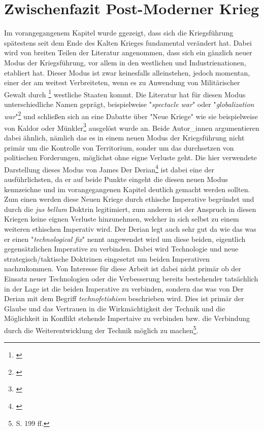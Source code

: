 \documentclass[11pt,a4paper,oneside,numbers=noenddot,bibliography=totocnumbered,DIV=13]{scrartcl}
\begin{document}
\section{Zwischenfazit Post-Moderner Krieg}
Im vorangegangenem Kapitel wurde ggezeigt, dass sich die Kriegsführung spätestens seit dem Ende des Kalten Krieges fundamental verändert hat. Dabei wird von breiten Teilen der Literatur angenommen, dass sich ein gänzlich  neuer Modus der Kriegsführung, vor allem in den westlichen und Industrienationen, etabliert hat. Dieser Modus  ist zwar keinesfalls alleinstehen, jedoch momentan, einer der am weitest Verbreiteten, wenn es zu Anwendung von Militärischer Gewalt durch \footnote{\cite{duyvesteyn_rethinking_2005}} westliche Staaten kommt. Die Literatur hat für diesen Modus unterschiedliche Namen geprägt, beispielweise "\textit{spectacle war}" oder "\textit{globalization war}"\footnote{\cite{bauman_wars_2001}} und schließen sich an eine Dabatte über "Neue Kriege" wie sie beispielweise von Kaldor oder Münkler\footnote{\cite{munkler_neuen_2004}} ausgelöst wurde an. Beide Autor\_innen argumentieren dabei ähnlich, nämlich das es in einem neuen Modus der Kriegsführung nicht primär um die Kontrolle von Territorium, sonder um das durchsetzen von politischen Forderungen, möglichst ohne eigne Verluste geht. Die hier verwendete Darstellung dieses Modus von James Der Derian\footnote{\cite{DerDerian2001}}  ist dabei eine der ausführlichsten, da er auf beide Punkte eingeht die diesen neuen Modus kennzeichne und im vorangegangenen Kapitel deutlich gemacht werden sollten.\\
Zum einen werden diese Neuen Kriege durch ethische Imperative begründet und durch die \textit{jus bellum} Doktrin legitimiert, zum anderen ist der Anspruch in diesen Kriegen keine eignen Verluste hinzunehmen, welcher in sich selbst zu einem weiteren ethischen Imperativ wird. Der Derian legt auch sehr gut da wie das was er einen "\textit{technological fix}" nennt angewendet wird um diese beiden, eigentlich gegensätzlichen Imperative zu verbinden. Dabei wird Technologie und neue strategisch/taktische Doktrinen eingesetzt um beiden Imperativen nachzukommen. Von Interesse für diese Arbeit ist dabei nicht primär ob der Einsatz neuer Technologien oder die Verbesserung bereits bestehender tatsächlich in der Lage ist die beiden Imperative zu verbinden, sondern das was von Der Derian mit dem Begriff \textit{technofetishism} beschrieben wird. Dies ist primär der Glaube und das Vertrauen in die Wirkmächtigkeit der Technik und die Möglichkeit in Konflikt stehende Impertaive zu verbinden bzw. die Verbindung durch die Weiterentwicklung der Technik möglich zu machen\footnote{\cite{DerDerian2001}S. 199 ff.}.      
\newpage
\end{document}

